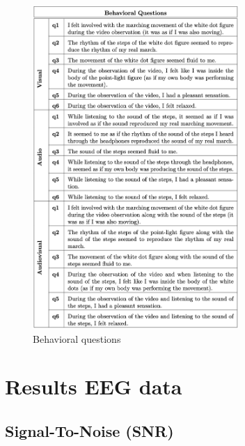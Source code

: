 \begin{figure}[ht]
    \centering
    \includegraphics[width=0.70\textwidth]{appendix/questions.png}
    \caption{Behavioral questions}
    \label{fig: Behavioral questions}
\end{figure}

\clearpage
\section*{Results EEG data}
\subsection*{Signal-To-Noise (SNR)}

